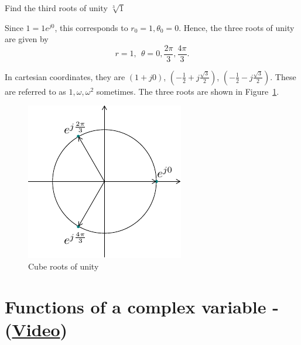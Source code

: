 \begin{example}

Find the third roots of unity $\sqrt[3]{1}$

Since $1 = 1 e^{j0}$, this corresponds to $r_0 = 1, \theta_0 = 0$. Hence, the three roots
of unity are given by
\[
r = 1, \ \ \theta = 0,\frac{2\pi}{3},\frac{4\pi}{3}.
\]

In cartesian coordinates, they are $(1+j0)$, $\left(-\frac{1}{2}+j\frac{\sqrt{3}}{2}\right)$, $\left(-\frac{1}{2}-j\frac{\sqrt{3}}{2}\right)$. These are referred to as $1,\omega,\omega^2$ sometimes. The three roots are shown in Figure~\ref{fig:cuberootsofunity}.
\begin{figure}[ht]
\begin{center}\includegraphics{../Images/ComplexNumbers/Chap0_cuberootsofunity.pdf}\end{center}
\caption{Cube roots of unity}
\label{fig:cuberootsofunity}
\end{figure}

\end{example}

\section{Functions of a complex variable - (\href{https://youtu.be/vxPfRFOrAyg}{Video})}

